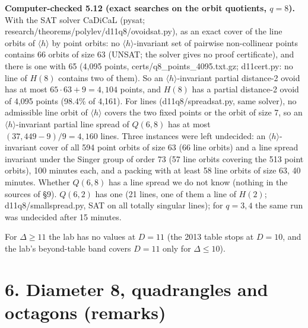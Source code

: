 \documentclass[
  10pt,
]{article}
\begin{document}
\textbf{Computer-checked 5.12 (exact searches on the orbit quotients,
\(q = 8\)).} With the SAT solver CaDiCaL (pysat;
research/theorems/polylev/d11q8/ovoidsat.py), as an exact cover of the
line orbits of \(\langle h\rangle\) by point orbits: no
\(\langle h\rangle\)-invariant set of pairwise non-collinear points
contains 66 orbits of size 63 (UNSAT; the solver gives no proof
certificate), and there is one with 65 (4,095 points,
certs/q8\_points\_4095.txt.gz; d11cert.py: no line of \(H(8)\) contains
two of them). So an \(\langle h\rangle\)-invariant partial distance-2
ovoid has at most \(65\cdot 63+9 = 4{,}104\) points, and \(H(8)\) has a
partial distance-2 ovoid of 4,095 points (98.4\% of 4,161). For lines
(d11q8/spreadsat.py, same solver), no admissible line orbit of
\(\langle h\rangle\) covers the two fixed points or the orbit of size 7,
so an \(\langle h\rangle\)-invariant partial line spread of \(Q(6,8)\)
has at most \((37{,}449-9)/9 = 4{,}160\) lines. Three instances were
left undecided: an \(\langle h\rangle\)-invariant cover of all 594 point
orbits of size 63 (66 line orbits) and a line spread invariant under the
Singer group of order 73 (57 line orbits covering the 513 point orbits),
100 minutes each, and a packing with at least 58 line orbits of size 63,
40 minutes. Whether \(Q(6,8)\) has a line spread we do not know (nothing
in the sources of §9). \(Q(6,2)\) has one (21 lines, one of them a line
of \(H(2)\); d11q8/smallspread.py, SAT on all totally singular lines);
for \(q = 3, 4\) the same run was undecided after 15 minutes.

For \(\Delta\ge 11\) the lab has no values at \(D = 11\) (the 2013 table
stops at \(D = 10\), and the lab's beyond-table band covers \(D = 11\)
only for \(\Delta\le 10\)).

\hypertarget{diameter-8-quadrangles-and-octagons-remarks}{%
\section{6. Diameter 8, quadrangles and octagons
(remarks)}\label{diameter-8-quadrangles-and-octagons-remarks}}
\end{document}
